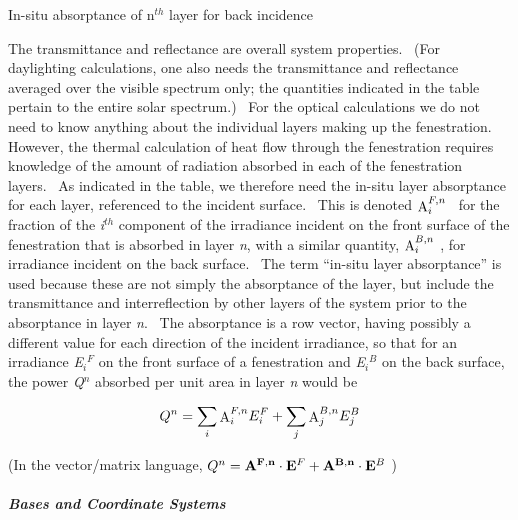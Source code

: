 In-situ absorptance of n\(^{th}\) layer for back incidence

The transmittance and reflectance are overall system properties.~ (For daylighting calculations, one also needs the transmittance and reflectance averaged over the visible spectrum only; the quantities indicated in the table pertain to the entire solar spectrum.)~ For the optical calculations we do not need to know anything about the individual layers making up the fenestration.~ However, the thermal calculation of heat flow through the fenestration requires knowledge of the amount of radiation absorbed in each of the fenestration layers.~ As indicated in the table, we therefore need the in-situ layer absorptance for each layer, referenced to the incident surface.~ This is denoted \({\mathop{\rm A}\nolimits}_i^{F,n}\) ~for the fraction of the \emph{i\(^{th}\)} component of the irradiance incident on the front surface of the fenestration that is absorbed in layer \emph{n}, with a similar quantity, \({\mathop{\rm A}\nolimits}_i^{B,n}\) , for irradiance incident on the back surface.~ The term ``in-situ layer absorptance'' is used because these are not simply the absorptance of the layer, but include the transmittance and interreflection by other layers of the system prior to the absorptance in layer \emph{n}.~ The absorptance is a row vector, having possibly a different value for each direction of the incident irradiance, so that for an irradiance \emph{E\(_{i}\)\(^{F}\)} on the front surface of a fenestration and \emph{E\(_{i}\)\(^{B}\)} on the back surface, the power \emph{Q\(^{n}\)} absorbed per unit area in layer \emph{n} would be

\begin{equation}
{Q^n} = \sum\limits_i {{\mathop{\rm A}\nolimits}_i^{F,n}E_i^F}  + \sum\limits_j {{\mathop{\rm A}\nolimits}_j^{B,n}E_j^B}
\end{equation}

(In the vector/matrix language, \({Q^n} = {\bf{A}^{F,n}} \cdot {{\bf{E}}^F} + {\bf{A}^{B,n}} \cdot {{\bf{E}}^B}\) )

\subparagraph{Bases and Coordinate Systems}\label{bases-and-coordinate-systems}

